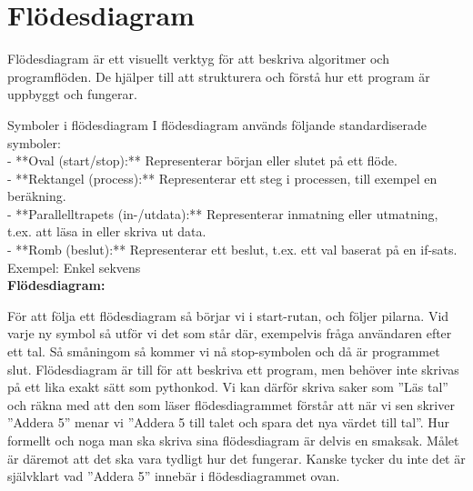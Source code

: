 \section{Flödesdiagram}
\label{section:flowchart}

Flödesdiagram är ett visuellt verktyg för att beskriva algoritmer och programflöden. De hjälper till att strukturera och förstå hur ett program är uppbyggt och fungerar.


Symboler i flödesdiagram
I flödesdiagram används följande standardiserade symboler:\\

- **Oval (start/stop):** Representerar början eller slutet på ett flöde.\\
- **Rektangel (process):** Representerar ett steg i processen, till exempel en beräkning.\\
- **Parallelltrapets (in-/utdata):** Representerar inmatning eller utmatning, t.ex. att läsa in eller skriva ut data.\\
- **Romb (beslut):** Representerar ett beslut, t.ex. ett val baserat på en if-sats.\\

Exempel: Enkel sekvens\\
\textbf{Flödesdiagram:}
\begin{center}
\end{center}

För att följa ett flödesdiagram så börjar vi i start-rutan, och följer pilarna. 
Vid varje ny symbol så utför vi det som står där, exempelvis fråga användaren efter ett tal. 
Så småningom så kommer vi nå stop-symbolen och då är programmet slut. 
Flödesdiagram är till för att beskriva ett program, men behöver inte skrivas på ett
lika exakt sätt som pythonkod. 
Vi kan därför skriva saker som ''Läs tal'' och räkna med att den som läser
flödesdiagrammet förstår att när vi sen skriver ''Addera 5'' menar vi ''Addera 5 till talet och spara det nya värdet till tal''.
Hur formellt och noga man ska skriva sina flödesdiagram är delvis en smaksak. 
Målet är däremot att det ska vara tydligt hur det fungerar. Kanske tycker du inte det är självklart vad ''Addera 5'' innebär i flödesdiagrammet ovan. 

